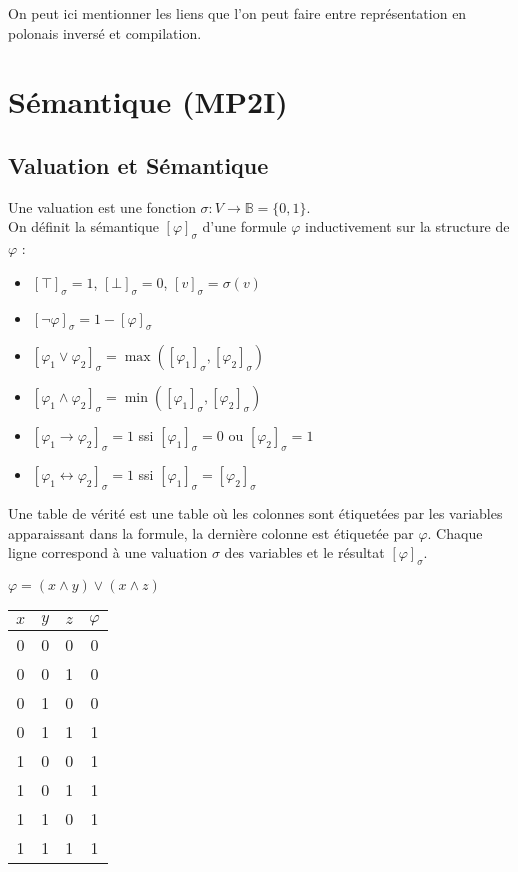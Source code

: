 \begin{com}
	On peut ici mentionner les liens que l'on peut faire entre représentation en polonais inversé et compilation.
\end{com}

\section{Sémantique (MP2I)}

\subsection{Valuation et Sémantique}

\begin{definition}
	Une valuation est une fonction $\sigma : V \to \mathbb B = \{0, 1\}$.\\
	On définit la sémantique $[\varphi]_\sigma$ d'une formule $\varphi$ inductivement sur la structure de $\varphi$ : \begin{itemize}[label=$\star$]
		\item $[\top]_\sigma = 1$, $[\bot]_\sigma = 0$, $[v]_\sigma = \sigma(v)$
		\item $[\neg \varphi]_\sigma = 1 - [\varphi]_\sigma$
		\item $[\varphi_1 \vee \varphi_2]_\sigma = \max ([\varphi_1]_\sigma, [\varphi_2]_\sigma)$
		\item $[\varphi_1 \wedge \varphi_2]_\sigma = \min ([\varphi_1]_\sigma, [\varphi_2]_\sigma)$
		\item $[\varphi_1 \rightarrow \varphi_2]_\sigma = 1$ ssi $[\varphi_1]_\sigma = 0$ ou $[\varphi_2]_\sigma = 1$
		\item $[\varphi_1 \leftrightarrow \varphi_2]_\sigma = 1$ ssi $[\varphi_1]_\sigma = [\varphi_2]_\sigma $
	\end{itemize} 
\end{definition}

\begin{definition}
	Une table de vérité est une table où les colonnes sont étiquetées par les variables apparaissant dans la formule, la dernière colonne est étiquetée par $\varphi$. Chaque ligne correspond à une valuation $\sigma$ des variables et le résultat $[\varphi]_\sigma$.
\end{definition}

\begin{example}
	$\varphi = (x\wedge y) \vee (x \wedge z)$\\
	\begin{tabular}{|c|c|c|c|}
		\hline $x$ & $y$ & $z$ & $\varphi$ \\ \hline
		0 & 0 & 0 & 0 \\ \hline
		0 & 0 & 1 & 0 \\ \hline
		0 & 1 & 0 & 0 \\ \hline
		0 & 1 & 1 & 1 \\ \hline
		1 & 0 & 0 & 1 \\ \hline
		1 & 0 & 1 & 1 \\ \hline
		1 & 1 & 0 & 1 \\ \hline
		1 & 1 & 1 & 1 \\ \hline
	\end{tabular}
\end{example}

